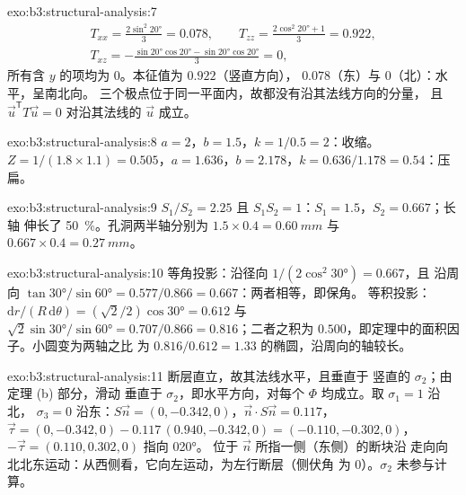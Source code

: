 \begin{solution}{exo:b3:structural-analysis:7}
\begin{gather*}
  T_{xx} = \frac{2\sin^2\ang{20}}3 = 0.078,\qquad
  T_{zz} = \frac{2\cos^2\ang{20} + 1}3 = 0.922,\\
  T_{xz} = -\frac{\sin\ang{20}\cos\ang{20} - \sin\ang{20}\cos\ang{20}}3 = 0,
\end{gather*}
所有含 $y$ 的项均为 0。本征值为 $0.922$（竖直方向），
$0.078$（东）与 $0$（北）：水平，呈南北向。
三个极点位于同一平面内，故都没有沿其法线方向的分量，
且 $\vec u^{\mathsf T}T\vec u = 0$ 对沿其法线的 $\vec u$ 成立。
\end{solution}

\begin{solution}{exo:b3:structural-analysis:8}
$a = 2$，$b = 1.5$，$k = 1/0.5 = 2$：收缩。$Z = 1/(1.8\times1.1) =
0.505$，$a = 1.636$，$b = 2.178$，$k = 0.636/1.178 = 0.54$：压扁。
\end{solution}

\begin{solution}{exo:b3:structural-analysis:9}
$S_1/S_2 = 2.25$ 且 $S_1S_2 = 1$：$S_1 = 1.5$，$S_2 = 0.667$；长轴
伸长了 \qty{50}{\percent}。孔洞两半轴分别为 $1.5\times0.4 =
\qty{0.60}{mm}$ 与 $0.667\times0.4 = \qty{0.27}{mm}$。
\end{solution}

\begin{solution}{exo:b3:structural-analysis:10}
等角投影：沿径向 $1/(2\cos^2\ang{30}) = 0.667$，且
沿周向 $\tan\ang{30}/\sin\ang{60} = 0.577/0.866 = 0.667$：两者相等，即保角。
等积投影：$\mathrm dr/(R\,\mathrm d\theta) = (\sqrt2/2)\cos\ang{30} = 0.612$
与 $\sqrt2\sin\ang{30}/\sin\ang{60} = 0.707/0.866 = 0.816$；二者之积为
$0.500$，即定理中的面积因子。小圆变为两轴之比
为 $0.816/0.612 = 1.33$ 的椭圆，沿周向的轴较长。
\end{solution}

\begin{solution}{exo:b3:structural-analysis:11}
断层直立，故其法线水平，且垂直于
竖直的 $\sigma_2$；由定理 (b) 部分，滑动
垂直于 $\sigma_2$，即水平方向，对每个 $\Phi$ 均成立。取 $\sigma_1 = 1$ 沿北，
$\sigma_3 = 0$ 沿东：$S\vec n = (0, -0.342, 0)$，$\vec n\cdot S\vec n =
0.117$，$\vec\tau = (0, -0.342, 0) - 0.117\,(0.940, -0.342, 0) = (-0.110,
-0.302, 0)$，$-\vec\tau = (0.110, 0.302, 0)$ 指向 \ang{020}。
位于 $\vec n$ 所指一侧（东侧）的断块沿
走向向北北东运动：从西侧看，它向左运动，为左行断层（侧伏角
为 0）。$\sigma_2$ 未参与计算。
\end{solution}

